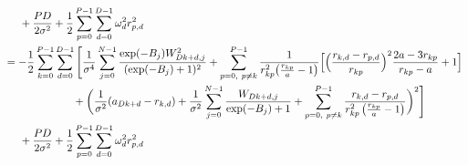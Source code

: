 \documentclass[12pt]{article}
\begin{document}
\begin{align*}
& \hspace*{.5 cm} + \frac{PD}{2\sigma^2}+ \frac{1}{2}\sum_{p=0}^{P-1} \sum_{d=0}^{D-1} \omega_d^2r_{p,d}^2\\
&= -\frac{1}{2} \sum_{k=0}^{P-1} \sum_{d=0}^{D-1}
\Bigg[ \frac{1}{\sigma^4} \sum_{j=0}^{N-1} \frac{\exp(-B_j)W_{Dk+d,j}^2}{(\exp(-B_j)+1)^2}
+ \sum_{p=0, \ p\neq k}^{P-1}  \frac{1}{r_{kp}^2 \big( \frac{r_{kp}}{a} -1 \big)}
\Big[ 
\Big( \frac{r_{k,d}-r_{p,d}}{r_{kp}} \Big)^2 \frac{2a-3r_{kp}}{r_{kp}-a}
 +1
\Big]  \\
& \hspace*{2.25 cm}
+ \bigg( 
\frac{1}{\sigma^2}(a_{Dk+d} -r_{k,d} )
+\frac{1}{\sigma^2}\sum_{j=0}^{N-1}  \frac{W_{Dk+d,j}}{\exp(-B_j)+1}
+\sum_{p=0, \ p\neq k}^{P-1} \frac{r_{k,d}-r_{p,d}}{r_{kp}^2 \left( \frac{r_{kp}}{a} -1 \right)}
 \bigg)^2  \Bigg]\\
& \hspace*{.5 cm} + \frac{PD}{2\sigma^2}+\frac{1}{2} \sum_{p=0}^{P-1} \sum_{d=0}^{D-1} \omega_d^2r_{p,d}^2\\
\end{align*}
\end{document}
